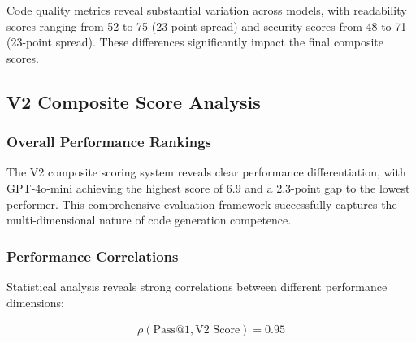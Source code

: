\documentclass[conference]{IEEEtran}
\begin{document}
Code quality metrics reveal substantial variation across models, with readability scores ranging from 52 to 75 (23-point spread) and security scores from 48 to 71 (23-point spread). These differences significantly impact the final composite scores.

\subsection{V2 Composite Score Analysis}

\subsubsection{Overall Performance Rankings}

\begin{table}[ht]
\centering
\small
\caption{V2 Composite Score Rankings and Performance Gaps}
\label{tab:v2_scores}
\end{table}

The V2 composite scoring system reveals clear performance differentiation, with GPT-4o-mini achieving the highest score of 6.9 and a 2.3-point gap to the lowest performer. This comprehensive evaluation framework successfully captures the multi-dimensional nature of code generation competence.

\subsubsection{Performance Correlations}

Statistical analysis reveals strong correlations between different performance dimensions:

\begin{align}
\rho(\text{Pass@1}, \text{V2 Score}) = 0.95
\end{align}
\end{document}
